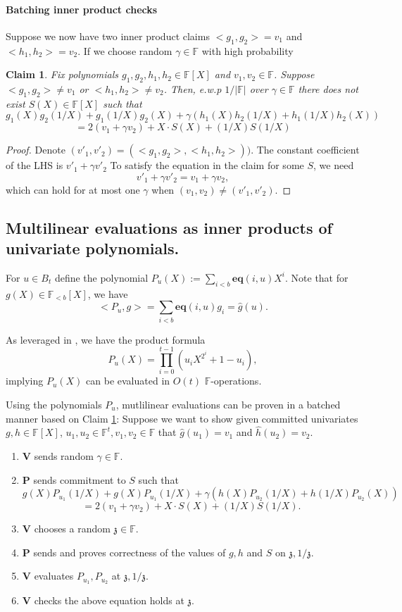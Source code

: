 \documentclass[11pt]{article} %
\newcommand{\F}{\ensuremath{\mathbb F}\xspace}
\newcommand{\defeq}{:=}
\newcommand{\prv}{\ensuremath{\mathsf{\mathbf{P}}}\xspace}
\newcommand{\ver}{\ensuremath{\mathsf{\mathbf{V}}}\xspace}
\newcommand{\polysofdeg}[1]{\ensuremath{\F_{< #1}[X]}\xspace}
\newcommand{\polys}{\ensuremath{\F[X]}\xspace}
\newcommand{\sumi}[1]{\sum_{i< #1}}
\newtheorem{claim}[lemma]{Claim}
\newcommand{\eq}{\ensuremath{\mathsf{eq}}\xspace}
\renewcommand{\eq}{\ensuremath{\mathbf{eq}}\xspace}
\newcommand{\eqpol}[1]{\ensuremath{P_{#1}}\xspace}
\newcommand{\mle}[1]{\ensuremath{\hat{#1}}\xspace}
\newcommand{\prodt}{\ensuremath{\prod_{i=0}^{t-1}}\xspace}
\newcommand{\B}[1]{\ensuremath{B_{#1}}\xspace}
\renewcommand{\zeta}{\mathfrak{z}}
\newcommand{\xinv}{\ensuremath{1/X}\xspace}
\begin{document}
\paragraph{Batching inner product checks}

Suppose we now have two  inner product claims  $<g_1,g_2>=v_1$ and $<h_1,h_2>=v_2$. 
If we choose random $\gamma \in \F$ with high probability
\begin{claim}\label{claim:batchipa}
 Fix polynomials $g_1,g_2,h_1,h_2\in \polys$ and $v_1,v_2\in \F$.
 Suppose $<g_1,g_2>\neq v_1$ or $<h_1,h_2>\neq v_2$. Then, e.w.p $1/|\F|$ over $\gamma\in \F$
 there does not exist $S(X)\in\polys$ such that
\[ g_1(X)g_2(\xinv)+ g_1(\xinv) g_2(X) + \gamma(h_1(X)h_2(\xinv) + h_1(\xinv)h_2(X)) \]
\[= 2(v_1+\gamma v_2) + X\cdot S(X)+(\xinv)S(\xinv)\]
 
\end{claim}
\begin{proof}
Denote $(v'_1,v'_2)=(<g_1,g_2>,<h_1,h_2>))$.
 The constant coefficient of the LHS is $v'_1+\gamma v'_2$
To satisfy the equation in the claim for some $S$, we need
 \[v'_1+\gamma v'_2=v_1+\gamma v_2,\]
which can hold for at most one $\gamma$ when $(v_1,v_2)\neq (v'_1,v'_2)$.
\end{proof}

\subsection{Multilinear evaluations as inner products of univariate polynomials.}
For $u\in \B{t}$ define the polynomial $\eqpol{u} (X)\defeq  \sumi{b}\eq(i,u)X^i$. 
Note that for $g(X)\in \polysofdeg{b}$, we have
\[<\eqpol{u},g>=\sumi{b}\eq(i,u) g_i = \mle{g}(u).\]

As leveraged in \cite{halo}, we have the product formula
\[\eqpol{u}(X)=\prodt\left(u_i X^{2^i}+1-u_i\right),
\]
implying $\eqpol{u}(X)$ can be evaluated in $O(t)$ \F-operations.

Using the polynomials \eqpol{u}, mutlilinear evaluations can be proven in a batched manner based on Claim \ref{claim:batchipa}:
Suppose we want to show given committed univariates $g,h\in\polys$, $u_1,u_2\in \F^t,v_1,v_2\in \F$ that
$\mle{g}(u_1)=v_1$ and $\mle{h}(u_2)=v_2$.
\begin{enumerate}
 \item \ver sends random $\gamma\in \F$.
 \item \prv sends commitment to $S$ such that
\[ g(X)P_{u_1}(1/X)+ g(X) P_{u_1}(1/X) + \gamma(h(X)P_{u_2}(1/X) + h(1/X)P_{u_2}(X))\]
\[= 2(v_1+\gamma v_2) + X\cdot S(X)+(1/X)S(1/X).\]
\item \ver chooses a random $\zeta\in \F$.
\item \prv sends and proves correctness of the values of $g,h$ and $S$ on $\zeta,1/\zeta$. 
\item \ver evaluates $P_{u_1},P_{u_2}$ at $\zeta,1/\zeta$. 
\item \ver checks the above equation holds at $\zeta$.
\end{enumerate}
\end{document}
